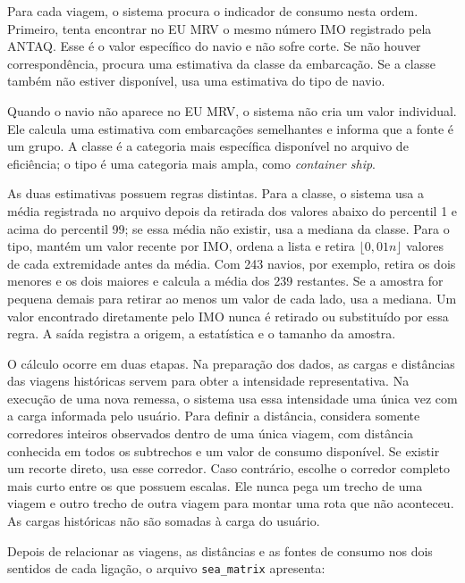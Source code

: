 \documentclass[12pt,a4paper]{report}
\begin{document}
Para cada viagem, o sistema procura o indicador de consumo nesta ordem. Primeiro, tenta encontrar no EU MRV o mesmo número IMO registrado pela ANTAQ. Esse é o valor específico do navio e não sofre corte. Se não houver correspondência, procura uma estimativa da classe da embarcação. Se a classe também não estiver disponível, usa uma estimativa do tipo de navio.

Quando o navio não aparece no EU MRV, o sistema não cria um valor individual. Ele calcula uma estimativa com embarcações semelhantes e informa que a fonte é um grupo. A classe é a categoria mais específica disponível no arquivo de eficiência; o tipo é uma categoria mais ampla, como \emph{container ship}.

As duas estimativas possuem regras distintas. Para a classe, o sistema usa a média registrada no arquivo depois da retirada dos valores abaixo do percentil 1 e acima do percentil 99; se essa média não existir, usa a mediana da classe. Para o tipo, mantém um valor recente por IMO, ordena a lista e retira \(\lfloor0{,}01n\rfloor\) valores de cada extremidade antes da média. Com 243 navios, por exemplo, retira os dois menores e os dois maiores e calcula a média dos 239 restantes. Se a amostra for pequena demais para retirar ao menos um valor de cada lado, usa a mediana. Um valor encontrado diretamente pelo IMO nunca é retirado ou substituído por essa regra. A saída registra a origem, a estatística e o tamanho da amostra.

O cálculo ocorre em duas etapas. Na preparação dos dados, as cargas e distâncias das viagens históricas servem para obter a intensidade representativa. Na execução de uma nova remessa, o sistema usa essa intensidade uma única vez com a carga informada pelo usuário. Para definir a distância, considera somente corredores inteiros observados dentro de uma única viagem, com distância conhecida em todos os subtrechos e um valor de consumo disponível. Se existir um recorte direto, usa esse corredor. Caso contrário, escolhe o corredor completo mais curto entre os que possuem escalas. Ele nunca pega um trecho de uma viagem e outro trecho de outra viagem para montar uma rota que não aconteceu. As cargas históricas não são somadas à carga do usuário.

Depois de relacionar as viagens, as distâncias e as fontes de consumo nos dois sentidos de cada ligação, o arquivo \texttt{sea\_matrix} apresenta:
\end{document}
